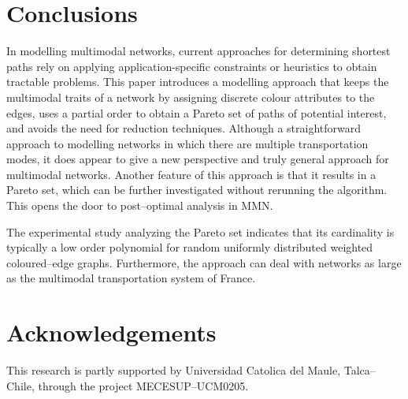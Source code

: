 \documentclass[preprint,authoryear,12pt]{elsarticle}
\begin{document}
\section{Conclusions}

In modelling multimodal networks, current approaches for determining shortest
paths rely on applying application-specific constraints or heuristics to
obtain tractable problems.
This paper introduces a modelling approach that keeps the multimodal
traits of a network by assigning discrete colour attributes to the
edges, uses a partial order to obtain a Pareto set of paths of potential interest,
and avoids the need for reduction techniques.
Although a straightforward approach to modelling networks in which there
are multiple transportation modes, it does appear to give a new perspective
and truly general approach for multimodal networks.
Another feature of this approach is that it results in a Pareto
set, which can be further investigated without rerunning the
algorithm. This opens the door to post--optimal analysis in MMN.

The experimental study analyzing the Pareto set indicates that its
cardinality is typically a low order polynomial for random
uniformly distributed weighted coloured--edge graphs.
Furthermore, the approach can deal with networks as large as the
multimodal transportation system of France. 

\section*{Acknowledgements}
This research is partly supported by Universidad Catolica del Maule,
Talca--Chile, through the project MECESUP--UCM0205.


{}
\end{document}

